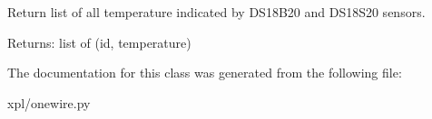 Return list of all temperature indicated by DS18B20 and DS18S20 sensors. 

\begin{Desc}
\item[Returns:]list of (id, temperature) \end{Desc}


The documentation for this class was generated from the following file:\begin{CompactItemize}
\item 
xpl/onewire.py\end{CompactItemize}
